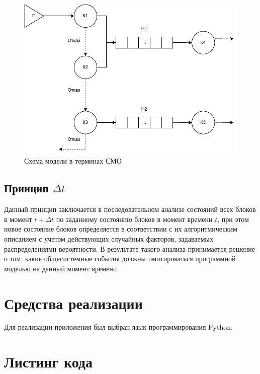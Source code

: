 \documentclass[12pt]{report}
\begin{document}
\begin{figure}[h!btp]
	\centering
	\includegraphics[width=0.8\columnwidth]{inc/schema2.pdf}
	\caption{Схема модели в терминах СМО}
	\label{img:schema2}	
\end{figure}

\subsection*{Принцип $\Delta t$}
Данный принцип заключается в последовательном анализе состояний всех блоков в момент $t + \Delta t$ по заданному состоянию блоков в момент времени $t$, при этом новое состояние блоков определяется в соответствии с их алгоритмическим описанием с учетом действующих случайных факторов, задаваемых распределениями вероятности. В результате такого анализа принимается решение о том, какие общесистемные события должны имитироваться программной моделью на данный момент времени.

\section*{Средства реализации}

Для реализации приложения был выбран язык программирования Python.

\clearpage
\section*{Листинг кода}
\end{document}
